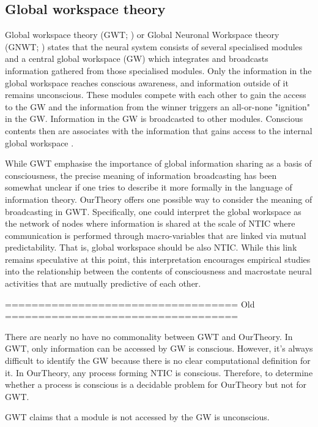\documentclass[utf8]{article}
\begin{document}
		\subsection{Global workspace theory}
		Global workspace theory (GWT; \cite{baars1988cognitive, baars1997theatre, baars2002conscious}) or Global Neuronal Workspace theory (GNWT; \cite{dehaene1998neuronal, dehaene2001towards, dehaene2011experimental}) states that the neural system consists of several specialised modules and a central global workspace (GW) which integrates and broadcasts information gathered from those specialised modules. Only the information in the global workspace reaches conscious awareness, and information outside of it remains unconscious. These modules compete with each other to gain the access to the GW and the information from the winner triggers an all-or-none "ignition" in the GW. Information in the GW is broadcasted to other modules. Conscious contents then are associates with the information that gains access to the internal global workspace \cite{Dehaene2017}.
		
        While GWT emphasise the importance of global information sharing as a basis of consciousness, the precise meaning of information broadcasting has been somewhat unclear if one tries to describe it more formally in the language of information theory. \ac{OurTheory} offers one possible way to consider the meaning of broadcasting in GWT. Specifically, one could interpret the global workspace as the network of nodes where information is shared at the scale of NTIC where communication is performed through macro-variables that are linked via mutual predictability. That is, global workspace should be also NTIC. While this link remains speculative at this point, this interpretation encourages empirical studies into the relationship between the contents of consciousness and macrostate neural activities that are mutually predictive of each other. 
		
		
		=================================== Old  =================================== 
		
	    There are nearly no have no commonality between GWT and \ac{OurTheory}. In GWT, only information can be accessed by GW is conscious. However, it's always difficult to identify the GW because there is no clear computational definition for it. In \ac{OurTheory}, any process forming NTIC is conscious. Therefore, to determine whether a process is conscious is a decidable problem for \ac{OurTheory} but not for GWT. 
	    
	    GWT claims that a module is not accessed by the GW is unconscious. 
		
\end{document}
